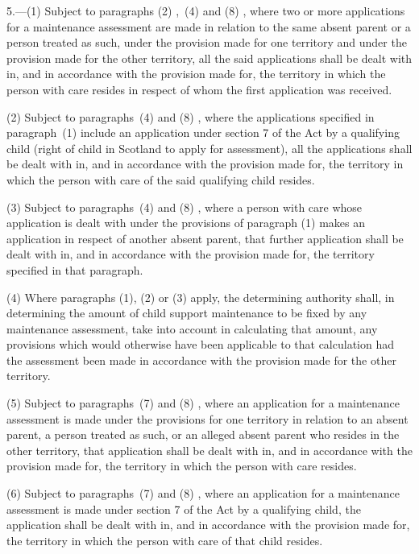 \documentclass[12pt,a4paper]{article}
\begin{document}
\renewcommand\parthead{--- Schedule 1 Part II}

5.—(1) Subject to paragraphs (2)%
,~(4) and (8)%
, where two or more applications for a maintenance assessment are made in relation to the same absent parent or a person treated as such, under the provision made for one territory and under the provision made for the other territory, all the said applications shall be dealt with in, and in accordance with the provision made for, the territory in which the person with care resides in respect of whom the first application was received.

(2) Subject to 
paragraphs~(4) and (8)%
, where the applications specified in paragraph~(1) include an application under section 7 of the Act by a qualifying child (right of child in Scotland to apply for assessment), all the applications shall be dealt with in, and in accordance with the provision made for, the territory in which the person with care of the said qualifying child resides.

(3) Subject to 
paragraphs~(4) and (8)%
, where a person with care whose application is dealt with under the provisions of paragraph (1) makes an application in respect of another absent parent, that further application shall be dealt with in, and in accordance with the provision made for, the territory specified in that paragraph.

(4) Where paragraphs (1), (2) or (3) apply, the determining authority shall, in determining the amount of child support maintenance to be fixed by any maintenance assessment, take into account in calculating that amount, any provisions which would otherwise have been applicable to that calculation had the assessment been made in accordance with the provision made for the other territory.

(5) Subject to 
paragraphs~(7) and (8)%
, where an application for a maintenance assessment is made under the provisions for one territory in relation to an absent parent, a person treated as such, or an alleged absent parent who resides in the other territory, that application shall be dealt with in, and in accordance with the provision made for, the territory in which the person with care resides.

(6) Subject to 
paragraphs~(7) and (8)%
, where an application for a maintenance assessment is made under section 7 of the Act by a qualifying child, the application shall be dealt with in, and in accordance with the provision made for, the territory in which the person with care of that child resides.
\end{document}
